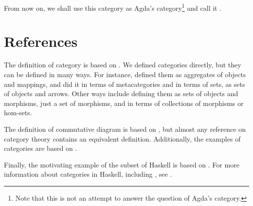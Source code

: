 From now on, we shall use this category as Agda's
category\footnote{Note that this is not an attempt to answer the
  question of Agda's category.} and call it \agda.

\section{References}
\label{sec:categories-references}

The definition of category is based on
\parencites[4--5]{awodey-2010}[7--8, 289]{maclane-1998}. We defined
categories directly, but they can be defined in many ways. For
instance, \textcite{eilenberg-maclane-1945} defined them as aggregates
of objects and mappings, and \textcite{maclane-1998} did it in terms
of metacategories and in terms of sets, as sets of objects and arrows.
Other ways include defining them as sets of objects and morphisms,
just a set of morphisms, and in terms of collections of morphisms or
hom-sets.

The definition of commutative diagram is based on
\parencites[8]{maclane-1998}[434--435]{poigne-1992}, but almost any
reference on category theory contains an equivalent definition.
Additionally, the examples of categories are based on
\parencites[7--8]{awodey-2010}[8--12, 21]{maclane-1998}[Example
  1.1.14]{pierce-1991}[§ 1.2.2]{poigne-1992}.

Finally, the motivating example of the subset of Haskell is based on
\parencites[Example 1.1.15]{pierce-1991}[7--11]{pitt-1986}. For more
information about categories in Haskell, including \hask, see
\parencites[74]{elkins-2009}[49--51]{yorgey-2009}.

\clearemptydoublepage
